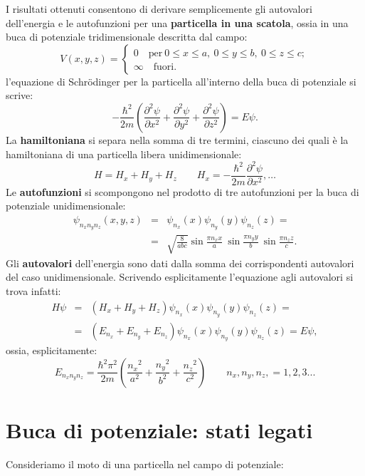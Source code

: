 \documentclass[a4paper,11pt,oneside]{book}
\begin{document}
I risultati ottenuti consentono di derivare semplicemente gli autovalori dell'energia e le autofunzioni per una \textbf{particella in una scatola}, ossia in una buca di potenziale tridimensionale descritta dal campo:
\begin{equation}
V(x,y,z)= 
\begin{cases}
0 \quad \textrm{per}\ 0\leq x \leq a,\ 0\leq y \leq b,\ 0 \leq z \leq c;\\
\infty \quad \textrm{fuori.}
\end{cases}
\end{equation}
l'equazione di Schr\"{o}dinger per la particella all'interno della buca di potenziale si scrive:
\begin{equation}
-\frac{\hbar ^2}{2m} \left( \frac{\partial ^2 \psi}{\partial x^2}+\frac{\partial ^2 \psi}{\partial y^2}+\frac{\partial ^2 \psi}{\partial z^2}\right) = E \psi.
\end{equation}
La \textbf{hamiltoniana} si separa nella somma di tre termini, ciascuno dei quali è la  hamiltoniana di una particella libera unidimensionale:
\begin{equation}
H= H_x+H_y+H_z \qquad H_x= -\frac{\hbar ^2}{2m}  \frac{\partial ^2 \psi}{\partial x^2}, \dots
\end{equation}
Le \textbf{autofunzioni} si scompongono nel prodotto di tre autofunzioni per la buca di potenziale unidimensionale:
\begin{eqnarray}
\psi _{n_x n_y n_z} (x,y,z) &=& \psi _{n_x}(x)\psi _{n_y}(y)\psi _{n_z}(z)= \nonumber \\
&=&\sqrt{\frac{8}{abc}}\sin \frac{\pi n_x x}{a}\ \sin \frac{\pi n_y y}{b}\ \sin \frac{\pi n_z z}{c}.
\end{eqnarray}
Gli \textbf{autovalori} dell'energia sono dati dalla somma dei corrispondenti autovalori del caso unidimensionale. Scrivendo esplicitamente l'equazione agli autovalori si trova infatti:
\begin{eqnarray}
H\psi  &=& \left(H_x+H_y+H_z\right) \psi _{n_x}(x)\psi _{n_y}(y)\psi _{n_z}(z)= \nonumber \\
&=& \left( E_{n_x}+E_{n_y}+E_{n_z}\right) \psi _{n_x}(x)\psi _{n_y}(y)\psi _{n_z}(z)=  E\psi,
\end{eqnarray}
ossia, esplicitamente:
\begin{equation}
E_{n_x n_y n_z}=\frac{\hbar ^2 \pi^2}{2m} \left(\frac{{n_x}^2}{a^2}+\frac{{n_y}^2}{b^2}+\frac{{n_z}^2}{c^2}\right) \qquad n_x, n_y, n_z, = 1,2,3... 
\end{equation}
\section{Buca di potenziale: stati legati}
Consideriamo il moto di una particella nel campo di potenziale:\\
\end{document}
